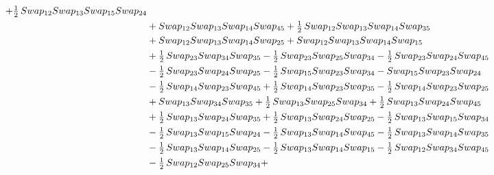\documentclass[10pt,a4paper]{amsart}
\begin{document}
\begin{align*}
        + \tfrac12\,\textnormal{Swap}_{12} \textnormal{Swap}_{13} \textnormal{Swap}_{15} \textnormal{Swap}_{24} \\ &
        + \textnormal{Swap}_{12} \textnormal{Swap}_{13} \textnormal{Swap}_{14} \textnormal{Swap}_{45} 
        + \tfrac12\,\textnormal{Swap}_{12} \textnormal{Swap}_{13} \textnormal{Swap}_{14} \textnormal{Swap}_{35}\\ & 
        +\textnormal{Swap}_{12} \textnormal{Swap}_{13} \textnormal{Swap}_{14} \textnormal{Swap}_{25} 
        + \textnormal{Swap}_{12} \textnormal{Swap}_{13} \textnormal{Swap}_{14} \textnormal{Swap}_{15} \\ &
        + \tfrac12\,\textnormal{Swap}_{23} \textnormal{Swap}_{34} \textnormal{Swap}_{35} - \tfrac12\,\textnormal{Swap}_{23} \textnormal{Swap}_{25} \textnormal{Swap}_{34} -
        \tfrac12\,\textnormal{Swap}_{23} \textnormal{Swap}_{24} \textnormal{Swap}_{45}\\ & - \tfrac12\,\textnormal{Swap}_{23} \textnormal{Swap}_{24} \textnormal{Swap}_{25} - \tfrac12\,\textnormal{Swap}_{15} \textnormal{Swap}_{23} \textnormal{Swap}_{34} - \textnormal{Swap}_{15} \textnormal{Swap}_{23} \textnormal{Swap}_{24}\\ & -
        \tfrac12\,\textnormal{Swap}_{14} \textnormal{Swap}_{23} \textnormal{Swap}_{45} + \tfrac12\,\textnormal{Swap}_{14} \textnormal{Swap}_{23} \textnormal{Swap}_{35} - \tfrac12\,\textnormal{Swap}_{14} \textnormal{Swap}_{23} \textnormal{Swap}_{25}\\ & + \textnormal{Swap}_{13} \textnormal{Swap}_{34} \textnormal{Swap}_{35} +
        \tfrac12\,\textnormal{Swap}_{13} \textnormal{Swap}_{25} \textnormal{Swap}_{34} + \tfrac12\,\textnormal{Swap}_{13} \textnormal{Swap}_{24} \textnormal{Swap}_{45}\\ & + \tfrac12\,\textnormal{Swap}_{13} \textnormal{Swap}_{24} \textnormal{Swap}_{35} + \tfrac12\,\textnormal{Swap}_{13} \textnormal{Swap}_{24} \textnormal{Swap}_{25} -
        \tfrac12\,\textnormal{Swap}_{13} \textnormal{Swap}_{15} \textnormal{Swap}_{34}\\ & - \tfrac12\,\textnormal{Swap}_{13} \textnormal{Swap}_{15} \textnormal{Swap}_{24} - \tfrac12\,\textnormal{Swap}_{13} \textnormal{Swap}_{14} \textnormal{Swap}_{45} - \tfrac12\,\textnormal{Swap}_{13} \textnormal{Swap}_{14} \textnormal{Swap}_{35}\\ & -
        \tfrac12\,\textnormal{Swap}_{13} \textnormal{Swap}_{14} \textnormal{Swap}_{25} - \tfrac12\,\textnormal{Swap}_{13} \textnormal{Swap}_{14} \textnormal{Swap}_{15} - \tfrac12\,\textnormal{Swap}_{12} \textnormal{Swap}_{34} \textnormal{Swap}_{45}\\ & - \tfrac12\,\textnormal{Swap}_{12} \textnormal{Swap}_{25} \textnormal{Swap}_{34} +

\end{align*}
\end{document}
